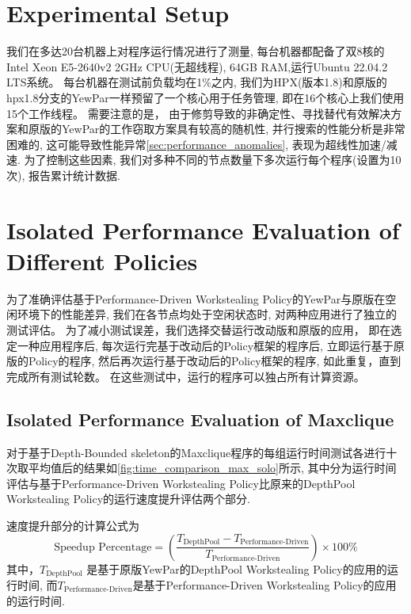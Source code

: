\documentclass{mproj}
\begin{document}
\section{Experimental Setup}
我们在多达20台机器上对程序运行情况进行了测量,
每台机器都配备了双8核的Intel Xeon E5-2640v2 2GHz CPU(无超线程),
64GB RAM,运行Ubuntu 22.04.2 LTS系统。
每台机器在测试前负载均在1\%之内,
我们为HPX(版本1.8)和原版的hpx1.8分支的YewPar一样预留了一个核心用于任务管理,
即在16个核心上我们使用15个工作线程。
需要注意的是，
由于修剪导致的非确定性、寻找替代有效解决方案和原版的YewPar的工作窃取方案具有较高的随机性,
并行搜索的性能分析是非常困难的,
这可能导致性能异常\ref{sec:performance_anomalies},
表现为超线性加速/减速.
为了控制这些因素,
我们对多种不同的节点数量下多次运行每个程序(设置为10次),
报告累计统计数据.

\section{Isolated Performance Evaluation of Different Policies}

为了准确评估基于Performance-Driven Workstealing Policy的YewPar与原版在空闲环境下的性能差异,
我们在各节点均处于空闲状态时,
对两种应用进行了独立的测试评估。
为了减小测试误差，我们选择交替运行改动版和原版的应用，
即在选定一种应用程序后,
每次运行完基于改动后的Policy框架的程序后,
立即运行基于原版的Policy的程序,
然后再次运行基于改动后的Policy框架的程序,
如此重复，直到完成所有测试轮数。
在这些测试中，运行的程序可以独占所有计算资源。

\subsection{Isolated Performance Evaluation of Maxclique}

对于基于Depth-Bounded skeleton的Maxclique程序的每组运行时间测试各进行十次取平均值后的结果如\cref{fig:time_comparison_max_solo}所示,
其中分为运行时间评估与基于Performance-Driven Workstealing Policy比原来的DepthPool Workstealing Policy的运行速度提升评估两个部分.

速度提升部分的计算公式为
\begin{equation}
    \text{Speedup Percentage} = \left( \frac{T_{\text{DepthPool}} - T_{\text{Performance-Driven}}}{T_{\text{Performance-Driven}}} \right) \times 100\%
\end{equation}
其中，\( T_{\text{DepthPool}} \) 是基于原版YewPar的DepthPool Workstealing Policy的应用的运行时间,
而\( T_{\text{Performance-Driven}} \)是基于Performance-Driven Workstealing Policy的应用的运行时间.
\end{document}

